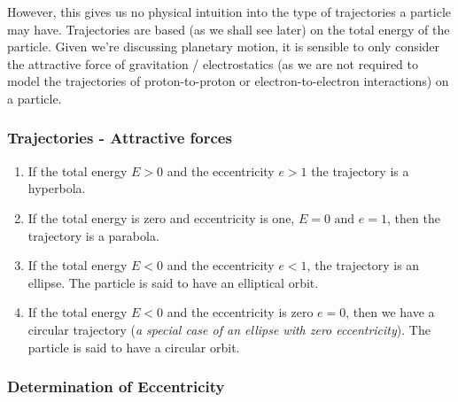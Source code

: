 However, this gives us no physical intuition into the type of trajectories a particle may have. Trajectories are based (as we shall see later) on the total energy of the particle. Given we're discussing planetary motion, it is sensible to only consider the attractive force of gravitation / electrostatics (as we are not required to model the trajectories of proton-to-proton or electron-to-electron interactions) on a particle. 

\subsubsection{Trajectories - Attractive forces}
\begin{enumerate}
    \item If the total energy $E > 0$ and the eccentricity $e > 1$ the trajectory is a hyperbola.
    \item If the total energy is zero and eccentricity is one, $E = 0 \text{ and } e = 1$, then the trajectory is a parabola.
    \item If the total energy $E < 0$ and the eccentricity $e < 1$, the trajectory is an ellipse. The particle is said to have an elliptical orbit. 
    \item If the total energy $E < 0$ and the eccentricity is zero $e = 0$, then we have a circular trajectory (\textit{a special case of an ellipse with zero eccentricity}). The particle is said to have a circular orbit.
\end{enumerate}


\subsubsection{Determination of Eccentricity}

